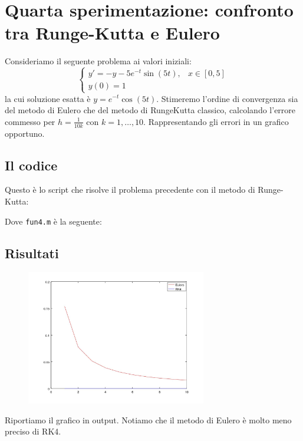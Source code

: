 \documentclass{article}
\begin{document}
	\section{Quarta sperimentazione: confronto tra Runge-Kutta e Eulero}
	Consideriamo il seguente problema ai valori iniziali:
	\begin{equation}
	\begin{cases}
	y'=-y-5e^{-t} \sin(5t), & x \in\left[0, 5\right] \\
	y(0)=1
	\end{cases}
	\end{equation}
	la cui soluzione esatta è $y=e^{-t} \cos(5t)$.
	Stimeremo l’ordine di convergenza sia del metodo di Eulero che del metodo di RungeKutta classico, calcolando l’errore commesso per $h=\frac{1}{10k}$ con $k = 1, \dots , 10$. Rappresentando gli errori in un grafico opportuno.
	
	\subsection{Il codice}
	Questo è lo script che risolve il problema precedente con il metodo di Runge-Kutta:
	
	
	
	Dove {\tt fun4.m} è la seguente:
	
	
	\subsection{Risultati}
	\begin{figure}[htp!]
		\centering 
		\includegraphics[width=0.7\textwidth]{2_4_confronto_RK_eulero.jpeg}
	\end{figure}

	Riportiamo il grafico in output.
	Notiamo che il metodo di Eulero è molto meno preciso di RK4.
	
\end{document}
